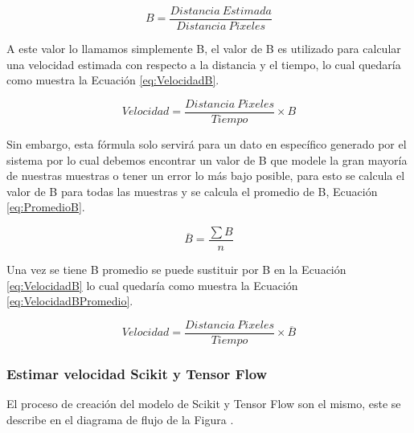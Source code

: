 \begin{equation}
    \label{eq:EcuacionB}
    B = \frac{Distancia \: Estimada}{Distancia \: Pixeles}
\end{equation}

A este valor lo llamamos simplemente B, el valor de B es utilizado para calcular una velocidad estimada con respecto a la distancia y el tiempo, lo cual quedaría como muestra la Ecuación \ref{eq:VelocidadB}.

\begin{equation}
    \label{eq:VelocidadB}
    Velocidad = \frac{Distancia \: Pixeles}{Tiempo} \times B
\end{equation}

Sin embargo, esta fórmula solo servirá para un dato en específico generado por el sistema por lo cual debemos encontrar un valor de B que modele la gran mayoría de nuestras muestras o tener un error lo más bajo posible, para esto se calcula el valor de B para todas las muestras y se calcula el promedio de B, Ecuación \ref{eq:PromedioB}.

\begin{equation}
    \label{eq:PromedioB}
    \overline{B} = \frac{\sum B}{n}
\end{equation}

Una vez se tiene B promedio se puede sustituir por B en la Ecuación \ref{eq:VelocidadB} lo cual quedaría como muestra la Ecuación \ref{eq:VelocidadBPromedio}.

\begin{equation}
    \label{eq:VelocidadBPromedio}
    Velocidad = \frac{Distancia \: Pixeles}{Tiempo} \times \overline{B}
\end{equation}



\subsubsection{Estimar velocidad Scikit y Tensor Flow}

El proceso de creación del modelo de Scikit y Tensor Flow son el mismo, este se describe en el diagrama de flujo de la Figura \label{ref:ModeloScikitTensorFlow}.

